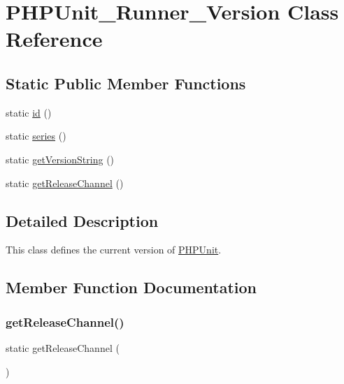 \hypertarget{class_p_h_p_unit___runner___version}{}\section{P\+H\+P\+Unit\+\_\+\+Runner\+\_\+\+Version Class Reference}
\label{class_p_h_p_unit___runner___version}
\subsection*{Static Public Member Functions}
\begin{DoxyCompactItemize}
\item 
static \mbox{\hyperlink{class_p_h_p_unit___runner___version_a2196ce91263823e966bd0f3e5b49528d}{id}} ()
\item 
static \mbox{\hyperlink{class_p_h_p_unit___runner___version_abe8f5f21eb5e37629b894a6796587bd6}{series}} ()
\item 
static \mbox{\hyperlink{class_p_h_p_unit___runner___version_aa7795483db5b6a1859d34f2ad103930a}{get\+Version\+String}} ()
\item 
static \mbox{\hyperlink{class_p_h_p_unit___runner___version_a61ee7abcc697e990d15f123453d565de}{get\+Release\+Channel}} ()
\end{DoxyCompactItemize}


\subsection{Detailed Description}
This class defines the current version of \mbox{\hyperlink{namespace_p_h_p_unit}{P\+H\+P\+Unit}}. 

\subsection{Member Function Documentation}
\mbox{\label{class_p_h_p_unit___runner___version_a61ee7abcc697e990d15f123453d565de}} 
\subsubsection{\texorpdfstring{get\+Release\+Channel()}{getReleaseChannel()}}
{\footnotesize\ttfamily static get\+Release\+Channel (\begin{DoxyParamCaption}{ }\end{DoxyParamCaption})\hspace{0.3cm}{\ttfamily [static]}}


